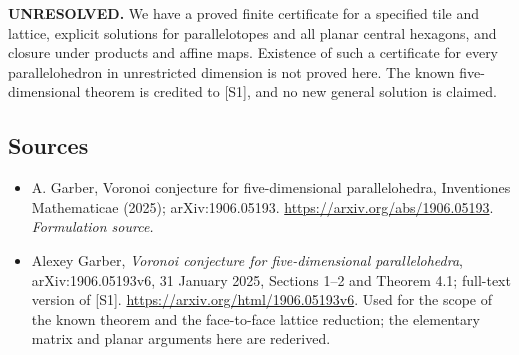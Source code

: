 \documentclass[11pt]{article}
\begin{document}
\textbf{UNRESOLVED.} We have a proved finite certificate for a specified
tile and lattice, explicit solutions for parallelotopes and all planar
central hexagons, and closure under products and affine maps. Existence
of such a certificate for every parallelohedron in unrestricted
dimension is not proved here. The known five-dimensional theorem is
credited to [S1], and no new general solution is claimed.

\subsection{Sources}
\begin{itemize}
\item[S1]A. Garber, Voronoi conjecture for five-dimensional parallelohedra, Inventiones Mathematicae (2025); arXiv:1906.05193.
\url{https://arxiv.org/abs/1906.05193}.
\textit{Formulation source.}
\item[E1]Alexey Garber, \textit{Voronoi conjecture for five-dimensional
parallelohedra}, arXiv:1906.05193v6, 31 January 2025, Sections 1--2 and
Theorem 4.1; full-text version of [S1].
\url{https://arxiv.org/html/1906.05193v6}.
Used for the scope of the known theorem and the face-to-face lattice
reduction; the elementary matrix and planar arguments here are rederived.
\end{itemize}
\end{document}
